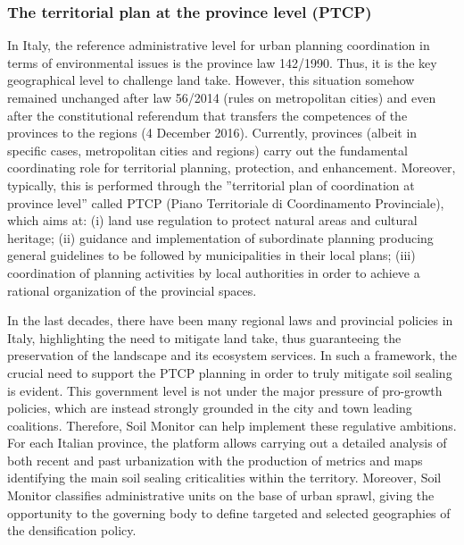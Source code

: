 \documentclass[APA,LATO1COL,doublespace]{WileyNJD-v2}
\begin{document}
\subsubsection{The territorial plan at the province level (PTCP)}
\label{sec:casePROV}
In Italy, the reference administrative level for urban planning coordination in terms of environmental issues is the province law 142/1990. 
Thus, it is the key geographical level to challenge land take. 
However, this situation somehow remained unchanged after law 56/2014 (rules on metropolitan cities) and even after the constitutional referendum that transfers the competences of the provinces to the regions (4 December 2016).
Currently, provinces (albeit in specific cases, metropolitan cities and regions) carry out the fundamental coordinating role for territorial planning, protection, and enhancement. 
Moreover, typically, this is performed through the ''territorial plan of coordination at province level'' called PTCP (Piano Territoriale di Coordinamento Provinciale), which aims at: (i) land use regulation to protect natural areas and cultural heritage; (ii) guidance and implementation of subordinate planning producing general guidelines to be followed by municipalities in their local plans; (iii) coordination of planning activities by local authorities in order to achieve a rational organization of the provincial spaces.

In the last decades, there have been many regional laws and provincial policies in Italy, highlighting the need to mitigate land take, thus guaranteeing the preservation of the landscape and its ecosystem services. 
In such a framework, the crucial need to support the PTCP planning in order to truly mitigate soil sealing is evident. 
This government level is not under the major pressure of pro-growth policies, which are instead strongly grounded in the city and town leading coalitions.
Therefore, Soil Monitor can help implement these regulative ambitions.
For each Italian province, the platform allows carrying out a detailed analysis of both recent and past urbanization with the production of metrics and maps identifying the main soil sealing criticalities within the territory.
Moreover, Soil Monitor classifies administrative units on the base of urban sprawl, giving the opportunity to the governing body to define targeted and selected geographies of the densification policy.
\end{document}
